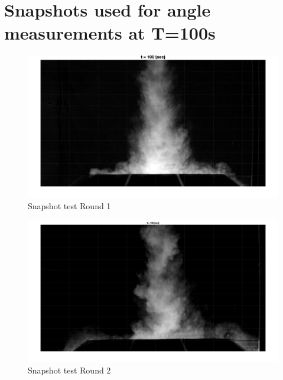 \chapter{Snapshots used for angle measurements at T=100s}
\label{app:Snapshots}

\newpage




\begin{figure}[ht!]
    \centering
    \includegraphics[width=\linewidth]{Images/Round_1_t100.jpg}
    \caption{Snapshot test Round 1}
\end{figure}

\begin{figure}[ht!]
    \centering
    \includegraphics[width=\linewidth]{Images/Round_2_t100.jpg}
    \caption{Snapshot test Round 2}
\end{figure}

